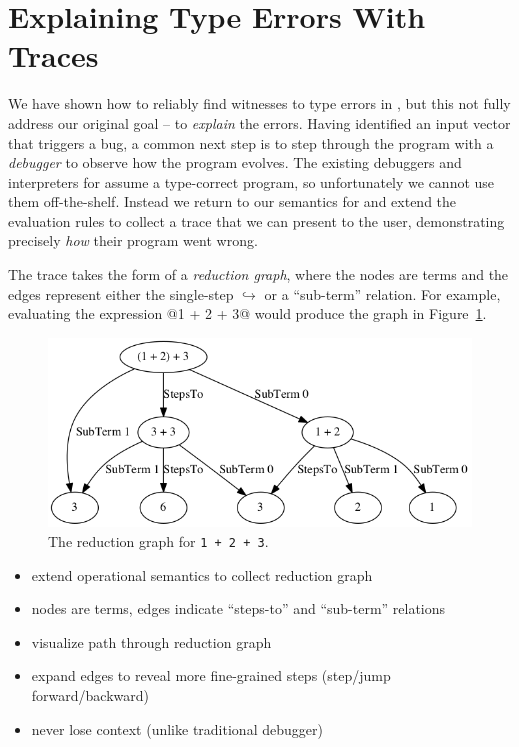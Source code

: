\section{Explaining Type Errors With Traces}
\label{sec:explaining}
%
We have shown how to reliably find witnesses to type errors in \ocaml,
but this not fully address our original goal -- to \emph{explain} the
errors.
%
Having identified an input vector that triggers a bug, a common next
step is to step through the program with a \emph{debugger} to observe
how the program evolves.
%
The existing debuggers and interpreters for \ocaml assume a type-correct
program, so unfortunately we cannot use them off-the-shelf.
%
Instead we return to our semantics for \lang and extend the evaluation
rules to collect a trace that we can present to the user, demonstrating
precisely \emph{how} their program went wrong.

The trace takes the form of a \emph{reduction graph}, where the nodes
are terms and the edges represent either the single-step
$\hookrightarrow$ or a ``sub-term'' relation. For example, evaluating
the expression @1 + 2 + 3@ would produce the graph in
Figure~\ref{fig:simple-reduction}.
%
\begin{figure}[t]
  \centering
  \includegraphics[width=\linewidth]{simple.png}
\caption{The reduction graph for \texttt{1 + 2 + 3}.}
\label{fig:simple-reduction}
\end{figure}
%


\begin{itemize}
\item extend operational semantics to collect reduction graph
\item nodes are terms, edges indicate ``steps-to'' and ``sub-term'' relations
\item visualize path through reduction graph
\item expand edges to reveal more fine-grained steps (step/jump forward/backward)
\item never lose context (unlike traditional debugger)
\end{itemize}
